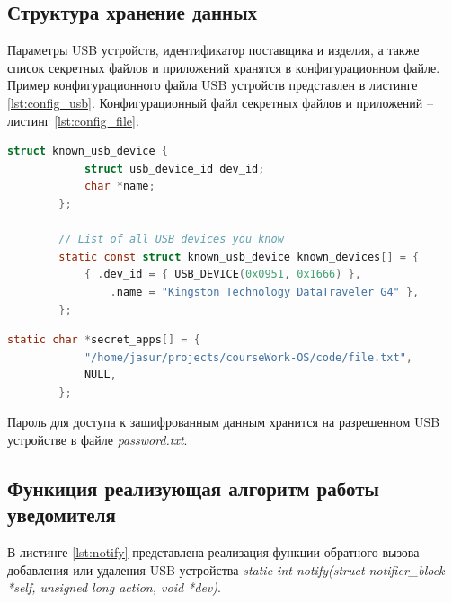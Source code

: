 \documentclass[a4paper, 10pt]{article}
\begin{document}
	\subsection{Структура хранение данных}
	\hspace*{5mm}Параметры USB устройств, идентификатор поставщика и изделия, а также список секретных файлов и приложений хранятся в конфигурационном файле. Пример конфигурационного файла USB устройств представлен в листинге \ref{lst:config_usb}. Конфигурационный файл секретных файлов и приложений -- листинг \ref{lst:config_file}.
	
	\begin{lstlisting}[language=C,caption = Конфигурационный файл USB устройств, label =  lst:config_usb]
		struct known_usb_device { 
			struct usb_device_id dev_id;    
			char *name;
		};
		
		// List of all USB devices you know
		static const struct known_usb_device known_devices[] = {    
			{ .dev_id = { USB_DEVICE(0x0951, 0x1666) }, 
				.name = "Kingston Technology DataTraveler G4" },
		};
	\end{lstlisting}
	
	\begin{lstlisting}[language=C,caption = Конфигурационный файл секретных файлов и приложений, label =  lst:config_file]  
		static char *secret_apps[] = {    
			"/home/jasur/projects/courseWork-OS/code/file.txt",
			NULL,
		};
	\end{lstlisting}
	
	
	\hspace*{5mm}Пароль для доступа к зашифрованным данным хранится на разрешенном USB устройстве в файле \textit{password.txt}.
	\subsection{Функиция реализующая алгоритм работы уведомителя}
	\hspace*{5mm}В листинге \ref{lst:notify} представлена реализация функции обратного вызова добавления или удаления USB устройства \textit{static int notify(struct notifier\_block *self, unsigned long action, void *dev)}. 
	
\end{document}
